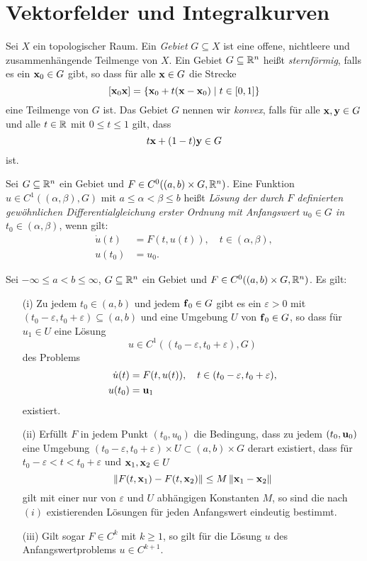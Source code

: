 \documentclass[
pdftex,
oneside,
headsepline,
11pt, 
]{scrreprt}
\begin{document}
\section{Vektorfelder und Integralkurven}
\begin{de}[Gebiet]
	Sei $X$ ein topologischer Raum. Ein \textit{Gebiet} $G\subseteq X$ ist eine offene, nichtleere und zusammenhängende Teilmenge von $X$. Ein Gebiet $G\subseteq \mathbb{R}^n$ heißt \textit{sternförmig}, falls es ein $\textnormal{\textbf{x}}_0\in G$ gibt, so dass für alle $\textnormal{\textbf{x}}\in G$ die Strecke \[[\textnormal{\textbf{x}}_0\textnormal{\textbf{x}}]=\lbrace \textnormal{\textbf{x}}_0+t(\textnormal{\textbf{x}}-\textnormal{\textbf{x}}_0)\mid t\in [0,1]\rbrace\] eine Teilmenge von $G$ ist. Das Gebiet $G$ nennen wir \textit{konvex}, falls für alle $\textnormal{\textbf{x}},\textnormal{\textbf{y}}\in G$ und alle $t\in \mathbb{R}$ mit $0\leq t\leq 1$ gilt, dass \[  t\textnormal{\textbf{x}}+(1-t)\textnormal{\textbf{y}}\in G \] ist.
\end{de}
\begin{de}
Sei $G\subseteq \mathbb{R}^n$ ein Gebiet und $F\in C^0((a,b)\times G,\mathbb{R}^n)$. Eine Funktion $u\in C^1((\alpha,\beta),G)$ mit $a\leq \alpha <\beta\leq b$ heißt \textit{Lösung der durch $F$ definierten gewöhnlichen Differentialgleichung erster Ordnung mit Anfangswert $u_0\in G$ in $t_0\in (\alpha,\beta)$}, wenn gilt: 
\begin{align*}
	\dot{u}(t)&=F(t,u(t)), \quad t\in (\alpha,\beta),\\
	u(t_0)&=u_0.
\end{align*} 
\end{de}
\begin{theo}
	Sei $-\infty\leq a<b\leq \infty$, $G\subseteq \mathbb{R}^n$ ein Gebiet und $F\in C^0((a,b)\times G,\mathbb{R}^n)$. Es gilt:
	\begin{itemize}
		\item[(i)] Zu jedem $t_0\in (a,b)$ und jedem $\textnormal{\textbf{f}}_0\in G$ gibt es ein $\varepsilon>0$ mit $(t_0-\varepsilon,t_0+\varepsilon)\subseteq (a,b)$ und eine Umgebung $U$ von $\textnormal{\textbf{f}}_0\in G$, so dass für $u_1\in U$ eine Lösung \[u\in C^1((t_0-\varepsilon,t_0+\varepsilon),G)\] des Problems \begin{align*}
		\dot{u}(t)&=F(t,u(t)),\quad t\in (t_0-\varepsilon,t_0+\varepsilon),\\u(t_0)&=\textnormal{\textbf{u}}_1
		\end{align*}
		existiert.
		\item[(ii)] Erfüllt $F$ in jedem Punkt $(t_0,u_0)$ die Bedingung, dass zu jedem $(t_0,\textnormal{\textbf{u}}_0)$ eine Umgebung $(t_0-\varepsilon,t_0+\varepsilon)\times U\subset(a,b)\times G$ derart existiert, dass für $t_0-\varepsilon<t<t_0+\varepsilon$ und $\textnormal{\textbf{x}}_1,\textnormal{\textbf{x}}_2\in U$ \[  \left\lVert F(t,\textnormal{\textbf{x}}_1)-F(t,\textnormal{\textbf{x}}_2)\right\rVert\leq M\left\lVert\textnormal{\textbf{x}}_1-\textnormal{\textbf{x}}_2\right\rVert \] gilt mit einer nur von $\varepsilon$ und $U$ abhängigen Konstanten $ M$, so sind die nach $(i)$ existierenden Lösungen für jeden Anfangswert eindeutig bestimmt.
		\item[(iii)] Gilt sogar $F\in C^k$ mit $k\geq 1$, so gilt für die Lösung $u$ des Anfangswertproblems $u\in C^{k+1}$.
	\end{itemize}
\end{theo}
\end{document}
